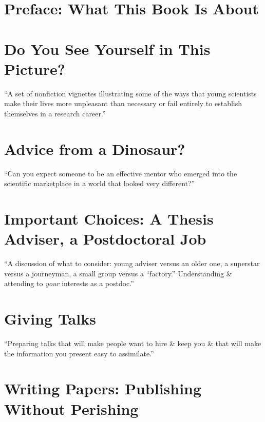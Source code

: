 \documentclass[oneside]{book}
\numberwithin{equation}{section}
\begin{document}
\section*{Preface: What This Book Is About}

\section{Do You See Yourself in This Picture?}

\begin{flushright}
	``A set of nonfiction vignettes illustrating some of the ways that young scientists make their lives more unpleasant than necessary or fail entirely to establish themselves in a research career.''
\end{flushright}

\section{Advice from a Dinosaur?}

\begin{flushright}
	``Can you expect someone to be an effective mentor who emerged into the scientific marketplace in a world that looked very different?''
\end{flushright}

\section{Important Choices: A Thesis Adviser, a Postdoctoral Job}

\begin{flushright}
	``A discussion of what to consider: young adviser versus an older one, a superstar versus a journeyman, a small group versus a ``factory.'' Understanding \& attending to \emph{your} interests as a postdoc.''
\end{flushright}

\section{Giving Talks}

\begin{flushright}
	``Preparing talks that will make people want to hire \& keep you \& that will make the information you present easy to assimilate.''
\end{flushright}

\section{Writing Papers: Publishing Without Perishing}
\end{document}

